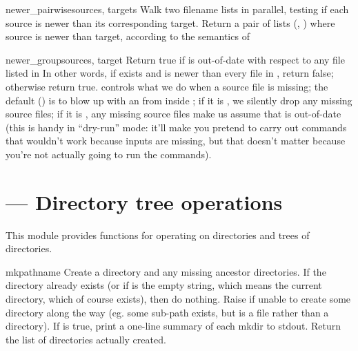 \documentclass{manual}
\begin{document}
\begin{funcdesc}{newer_pairwise}{sources, targets}
Walk two filename lists in parallel, testing if each source is newer
than its corresponding target.  Return a pair of lists (,
) where source is newer than target, according to the semantics
of 
\end{funcdesc}

\begin{funcdesc}{newer_group}{sources, target}
Return true if  is out-of-date with respect to any file
listed in   In other words, if  exists and is newer
than every file in , return false; otherwise return true.
 controls what we do when a source file is missing; the
default () is to blow up with an  from 
inside ;
if it is , we silently drop any missing source files; if it is
, any missing source files make us assume that  is
out-of-date (this is handy in ``dry-run'' mode: it'll make you pretend to
carry out commands that wouldn't work because inputs are missing, but
that doesn't matter because you're not actually going to run the
commands).
\end{funcdesc}

\section{ --- Directory tree operations}

This module provides functions for operating on directories and trees
of directories.

\begin{funcdesc}{mkpath}{name}
Create a directory and any missing ancestor directories.  If the
directory already exists (or if  is the empty string, which
means the current directory, which of course exists), then do
nothing.  Raise  if unable to create some
directory along the way (eg. some sub-path exists, but is a file
rather than a directory).  If  is true, print a one-line
summary of each mkdir to stdout.  Return the list of directories
actually created.
\end{funcdesc}
\end{document}
